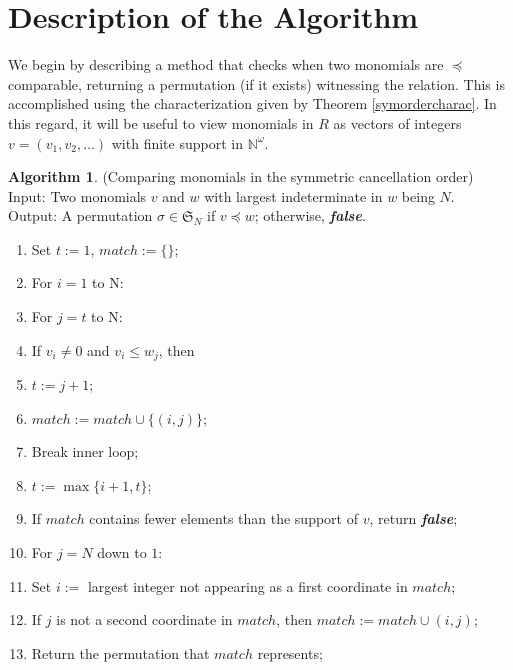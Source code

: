\documentclass{amsart}
\theoremstyle{definition}
\newtheorem{algorithm}[theorem]{Algorithm}
\theoremstyle{remark}
\numberwithin{equation}{section}
\newcommand{\<}{\langle}
\renewcommand{\>}{\rangle}
\begin{document}
\section{Description of the Algorithm}\label{algorithm}


We begin by describing a method that checks when two monomials are $\preceq$ comparable,
returning a permutation (if it exists) witnessing the relation.
This is accomplished using the characterization given by Theorem \ref{symordercharac}.
In this regard, it will be useful to view monomials in $R$ as vectors of 
integers $v = (v_1,v_2,\ldots)$ with finite support in $\mathbb N^{\omega}$.

\begin{algorithm}\label{vwcompalg}\mbox{}(Comparing monomials in the symmetric
cancellation order)\\
Input: Two monomials $v$ and $w$ with largest indeterminate in $w$ being $N$.\\
Output: A permutation $\sigma \in {\mathfrak S}_N$ if $v \preceq w$; otherwise, \textbf{\emph{false}}.
\begin{enumerate}
\item Set $t := 1$, $match := \{\}$;
\item For $i = 1$ to N:
\item[]\hspace{0.5cm} For $j = t$ to N:
\item[]\hspace{1.0cm} If $v_i \neq 0$ and $v_i \leq w_j$, then 
\item[]\hspace{1.5cm} $t := j+1$;
\item[]\hspace{1.5cm} $match := match \cup \{(i,j)\}$;
\item[]\hspace{1.5cm} Break inner loop;
\item[]\hspace{0.5cm} $t := \max\{i+1,t\}$;

\item If $match$ contains fewer elements than the support of $v$, return \textbf{\emph{false}};

\item For $j = N$ down to $1$:
\item[]\hspace{0.5cm} Set $i :=$ largest integer not appearing as a first coordinate in $match$;

\item[]\hspace{0.5cm} If $j$ is not a second coordinate in $match$, then $match := match \cup (i,j)$;
\item Return the permutation that $match$ represents;
\end{enumerate}
\end{algorithm}
\end{document}

